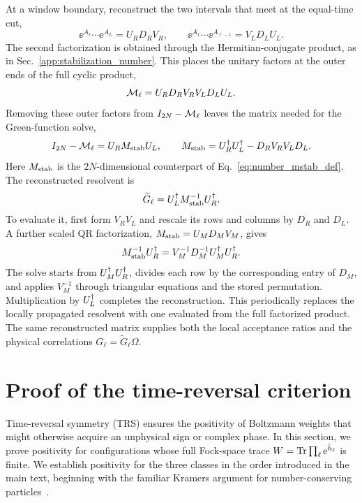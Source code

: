 At a window boundary, reconstruct the two intervals that meet at the equal-time cut,
\begin{equation}
    \ee^{A_\ell}\cdots\ee^{A_L}=U_RD_RV_R,
    \qquad
    \ee^{A_1}\cdots\ee^{A_{\ell-1}}=V_LD_LU_L.
\end{equation}
The second factorization is obtained through the Hermitian-conjugate product, as in Sec.~\ref{app:stabilization_number}. This places the unitary factors at the outer ends of the full cyclic product,
\begin{equation}
    \mathcal{M}_\ell=U_RD_RV_RV_LD_LU_L.
\end{equation}
Removing these outer factors from $I_{2N}-\mathcal{M}_\ell$ leaves the matrix needed for the Green-function solve,
\begin{equation}
    I_{2N}-\mathcal{M}_\ell=U_R M_{\rm stab}U_L,
    \qquad
    M_{\rm stab}=U_R^\dagger U_L^\dagger-D_RV_RV_LD_L.
\end{equation}
Here $M_{\rm stab}$ is the $2N$-dimensional counterpart of Eq.~\eqref{eq:number_mstab_def}. The reconstructed resolvent is
\begin{equation}
    \widetilde G_\ell=U_L^\dagger M_{\rm stab}^{-1}U_R^\dagger.
\end{equation}
To evaluate it, first form $V_RV_L$ and rescale its rows and columns by $D_R$ and $D_L$. A further scaled QR factorization, $M_{\rm stab}=U_MD_MV_M$, gives
\begin{equation}
    M_{\rm stab}^{-1}U_R^\dagger
    =V_M^{-1}D_M^{-1}U_M^\dagger U_R^\dagger.
\end{equation}
The solve starts from $U_M^\dagger U_R^\dagger$, divides each row by the corresponding entry of $D_M$, and applies $V_M^{-1}$ through triangular equations and the stored permutation. Multiplication by $U_L^\dagger$ completes the reconstruction. This periodically replaces the locally propagated resolvent with one evaluated from the full factorized product. The same reconstructed matrix supplies both the local acceptance ratios and the physical correlations $G_\ell=\widetilde G_\ell\Omega$.

\section{Proof of the time-reversal criterion}
\label{app:non-negative_proofs}
\label{app:trs_proof}

Time-reversal symmetry (TRS) ensures the positivity of Boltzmann weights that might otherwise acquire an unphysical sign or complex phase. In this section, we prove positivity for configurations whose full Fock-space trace $W=\operatorname{Tr}\prod_\ell\mathrm{e}^{\hat h_\ell}$ is finite. We establish positivity for the three classes in the order introduced in the main text, beginning with the familiar Kramers argument for number-conserving particles~\cite{wu2005prb,li2016prl}.


